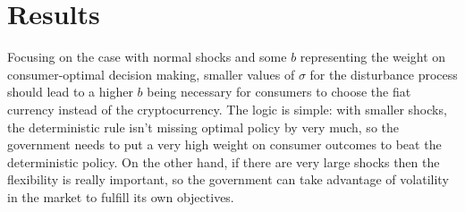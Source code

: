 \documentclass[dvipsnames]{article}
\begin{document}
\section{Results}
Focusing on the case with normal shocks and some $b$ representing the weight on consumer-optimal decision making, smaller values of $\sigma$ for the disturbance process should lead to a higher $b$ being necessary for consumers to choose the fiat currency instead of the cryptocurrency. The logic is simple: with smaller shocks, the deterministic rule isn't missing optimal policy by very much, so the government needs to put a very high weight on consumer outcomes to beat the deterministic policy. On the other hand, if there are very large shocks then the flexibility is really important, so the government can take advantage of volatility in the market to fulfill its own objectives.
\end{document}
